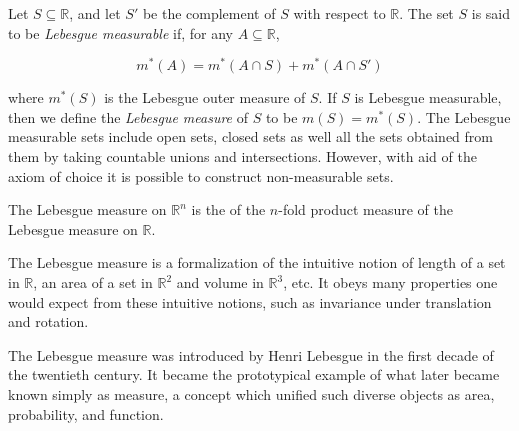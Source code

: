 \documentclass[12pt]{article}
\begin{document}
Let $S \subseteq \mathbb{R}$, and let $S'$ be the complement of $S$ with respect to $\mathbb{R}$.  The set $S$ is said to be \emph{Lebesgue measurable} if, for any $A \subseteq \mathbb{R}$,

$$m^{*}(A) = m^{*}(A \cap S) + m^{*}(A \cap S')$$

where $m^{*}(S)$ is the Lebesgue outer measure of $S$.  If $S$ is Lebesgue measurable, then we define the \emph{Lebesgue measure} of $S$ to be $m(S) = m^{*}(S)$. The Lebesgue measurable sets include open sets, closed sets as well all the sets obtained from them by taking countable unions and intersections. However, with aid of the axiom of choice it is possible to construct non-measurable sets.

The Lebesgue measure on $\mathbb{R}^n$ is the  of the $n$-fold product measure of the Lebesgue measure on $\mathbb{R}$. 

The Lebesgue measure is a formalization of the intuitive notion of length of a set in $\mathbb{R}$, an area of a set in $\mathbb{R}^2$ and volume in $\mathbb{R}^3$, etc. It obeys many properties one would expect from these intuitive notions, such as invariance under translation and rotation. 

The Lebesgue measure was introduced by Henri Lebesgue in the first decade of the twentieth century. It became the prototypical example of what later became known simply as measure, a concept which unified such diverse objects as area, probability, and function.
\end{document}
